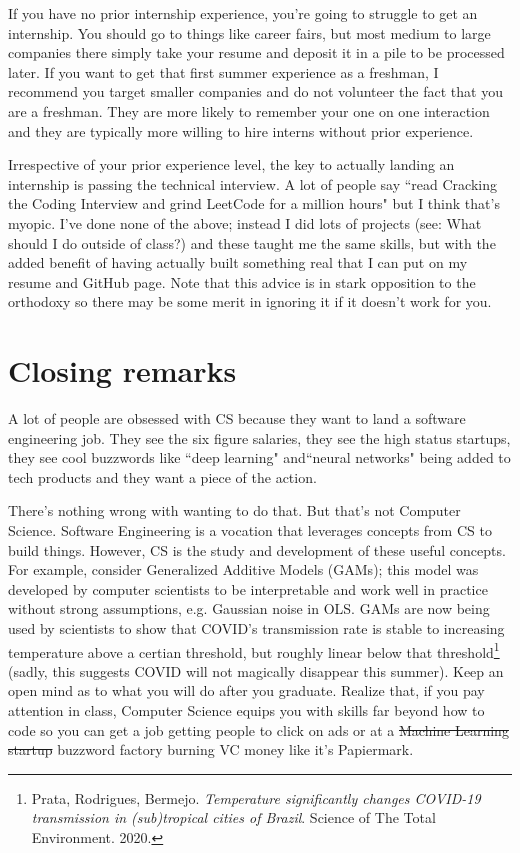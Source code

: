 \documentclass{article}
\begin{document}
If you have no prior internship experience, you're going to struggle to get an internship. You should go to things like career fairs, but most medium to large companies there simply take your resume and deposit it in a pile to be processed later. If you want to get that first summer experience as a freshman, I recommend you target smaller companies and do not volunteer the fact that you are a freshman. They are more likely to remember your one on one interaction and they are typically more willing to hire interns without prior experience.

Irrespective of your prior experience level, the key to actually landing an internship is passing the technical interview. A lot of people say ``read Cracking the Coding Interview and grind LeetCode for a million hours" but I think that's myopic. I've done none of the above; instead I did lots of projects (see: What should I do outside of class?) and these taught me the same skills, but with the added benefit of having actually built something real that I can put on my resume and GitHub page. Note that this advice is in stark opposition to the orthodoxy so there may be some merit in ignoring it if it doesn't work for you.

\section{Closing remarks}
A lot of people are obsessed with CS because they want to land a software engineering job. They see the six figure salaries, they see the high status startups, they see cool buzzwords like ``deep learning" and``neural networks" being added to tech products and they want a piece of the action.

There's nothing wrong with wanting to do that. But that's not Computer Science. Software Engineering is a vocation that leverages concepts from CS to build things. However, CS is the study and development of these useful concepts. For example, consider Generalized Additive Models (GAMs); this model was developed by computer scientists to be interpretable and work well in practice without strong assumptions, e.g. Gaussian noise in OLS. GAMs are now being used by scientists to show that COVID's transmission rate is stable to increasing temperature above a certian threshold, but roughly linear below that threshold\footnote{Prata, Rodrigues, Bermejo. \textit{Temperature significantly changes COVID-19 transmission in (sub)tropical cities of Brazil}. Science of The Total Environment. 2020.} (sadly, this suggests COVID will not magically disappear this summer). Keep an open mind as to what you will do after you graduate. Realize that, if you pay attention in class, Computer Science equips you with skills far beyond how to code so you can get a job getting people to click on ads or at a \sout{Machine Learning startup} buzzword factory burning VC money like it's Papiermark.
\end{document}
